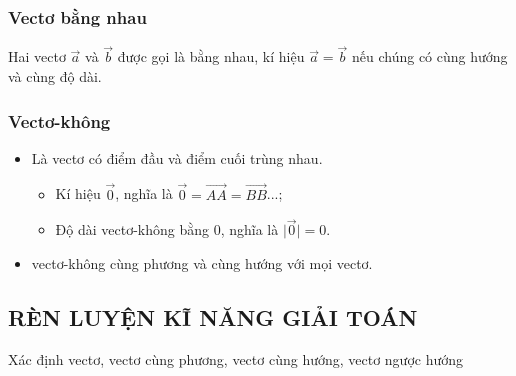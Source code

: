 \subsubsection{Vectơ bằng nhau}
Hai vectơ $\vec{a}$ và $\vec{b}$ được gọi là bằng nhau, kí hiệu $\vec{a}=\vec{b}$ nếu chúng có cùng hướng và cùng độ dài.
\subsubsection{Vectơ-không}
\begin{itemize}
	\item[\iconMT] Là vectơ có điểm đầu và điểm cuối trùng nhau.
	      \begin{itemize}
		      \item Kí hiệu $\vec{0}$, nghĩa là $\vec{0}=\vec{AA}=\vec{BB}$...;
		      \item Độ dài vectơ-không bằng $0$, nghĩa là $\bigg|\vec{0}\bigg|=0$.
	      \end{itemize}

	\item[\iconMT]  vectơ-không cùng phương và cùng hướng với mọi vectơ.
\end{itemize}
\subsection{RÈN LUYỆN KĨ NĂNG GIẢI TOÁN}

\begin{dang}{Xác định vectơ, vectơ cùng phương, vectơ cùng hướng, vectơ ngược hướng}
\end{dang}

\begin{vd}
\end{vd} 


